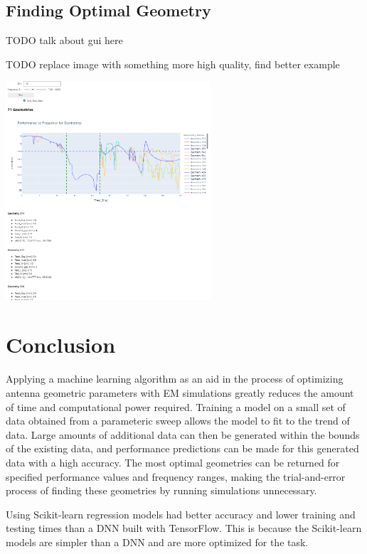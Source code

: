 \documentclass[lettersize,journal]{IEEEtran}
\newenvironment{Figure}
    {\par\medskip\noindent\minipage{\linewidth}}
    {\endminipage\par\medskip}
\begin{document}
\subsection{Finding Optimal Geometry}
TODO talk about gui here 

TODO replace image with something more high quality, find better example 

\begin{Figure}
    \centering
    \includegraphics[width=3in]{gui}
    \label{gui}
\end{Figure}


\section{Conclusion}
Applying a machine learning algorithm as an aid in the process of optimizing  antenna geometric parameters with EM simulations greatly reduces the amount of time and computational power required. Training a model on a small set of data obtained from a parameteric sweep allows the model to fit to the trend of data. Large amounts of additional data can then be generated within the bounds of the existing data, and performance predictions can be made for this generated data with a high accuracy. The most optimal geometries can be returned for specified performance values and frequency ranges, making the trial-and-error process of finding these geometries by running simulations unnecessary. 

Using Scikit-learn regression models had better accuracy and lower training and testing times than a DNN built with TensorFlow. This is because the Scikit-learn models are simpler than a DNN and are more optimized for the task.  
\end{document}
